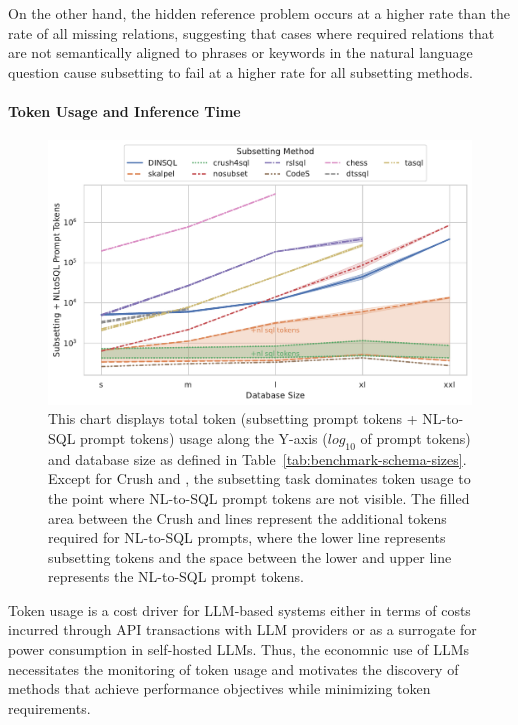 On the other hand, the hidden reference problem occurs at a higher rate than the rate of all missing relations, suggesting that cases where required relations that are not semantically aligned to phrases or keywords in the natural language question cause subsetting to fail at a higher rate for all subsetting methods. 

\paragraph{\textbf{Token Usage and Inference Time}}

\begin{figure}
  \centering
  \includegraphics[width=\linewidth]{figures/combined_tokens_by_db_size_linechart.pdf}
  \caption{This chart displays total token (subsetting prompt tokens + NL-to-SQL prompt tokens) usage along the Y-axis ($log_{10}$ of prompt tokens) and database size as defined in Table~\ref{tab:benchmark-schema-sizes}. Except for Crush and \PROJECTNAME, the subsetting task dominates token usage to the point where NL-to-SQL prompt tokens are not visible. The filled area between the Crush and \PROJECTNAME{ }lines represent the additional tokens required for NL-to-SQL prompts, where the lower line represents subsetting tokens and the space between the lower and upper line represents the NL-to-SQL prompt tokens.}
  \label{fig:tokens-by-dbsize}
\end{figure}

Token usage is a cost driver for LLM-based systems either in terms of costs incurred through API transactions with LLM providers or as a surrogate for power consumption in self-hosted LLMs.
Thus, the economnic use of LLMs necessitates the monitoring of token usage and motivates the discovery of methods that achieve performance objectives while minimizing token requirements.

